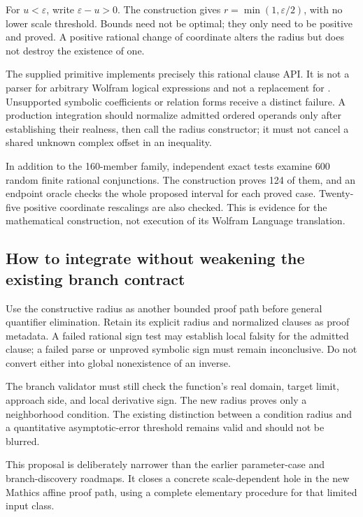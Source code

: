 \documentclass[11pt,a4paper]{article}
\newcommand{\code}[1]{\texttt{\detokenize{#1}}}
\begin{document}
For $u<\varepsilon$, write $\varepsilon-u>0$. The construction gives
$r=\min(1,\varepsilon/2)$, with no lower scale threshold. Bounds need not be
optimal; they only need to be positive and proved. A positive rational change
of coordinate alters the radius but does not destroy the existence of one.

The supplied \code{AffineRadius} primitive implements precisely this rational
clause API. It is not a parser for arbitrary Wolfram logical expressions and
not a replacement for \code{Reduce}. Unsupported symbolic coefficients or
relation forms receive a distinct failure. A production integration should
normalize admitted ordered operands only after establishing their realness,
then call the radius constructor; it must not cancel a shared unknown complex
offset in an inequality.

In addition to the 160-member family, independent exact tests examine 600
random finite rational conjunctions. The construction proves 124 of them, and
an endpoint oracle checks the whole proposed interval for each proved case.
Twenty-five positive coordinate rescalings are also checked. This is evidence
for the mathematical construction, not execution of its Wolfram Language
translation.

\subsection{How to integrate without weakening the existing branch contract}

Use the constructive radius as another bounded proof path before general
quantifier elimination. Retain its explicit radius and normalized clauses as
proof metadata. A failed rational sign test may establish local falsity for the
admitted clause; a failed parse or unproved symbolic sign must remain
inconclusive. Do not convert either into global nonexistence of an inverse.

The branch validator must still check the function's real domain, target
limit, approach side, and local derivative sign. The new radius proves only a
neighborhood condition. The existing distinction between a condition radius
and a quantitative asymptotic-error threshold remains valid and should not be
blurred. \cite{branches,mathicscallables}

This proposal is deliberately narrower than the earlier parameter-case and
branch-discovery roadmaps. It closes a concrete scale-dependent hole in the
new Mathics affine proof path, using a complete elementary procedure for that
limited input class.
\end{document}
